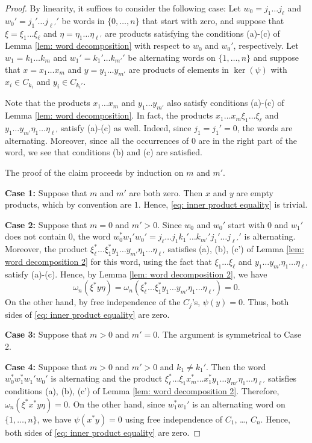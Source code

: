 \documentclass[10pt]{amsart}
\numberwithin{equation}{section}
\theoremstyle{definition}
\begin{document}
\begin{proof}
By linearity, it suffices to consider the following case:  Let $w_0 = j_1 \dots j_\ell$ and $w_0' = j_1' \dots j_{\ell'}'$ be words in $\{0,\dots,n\}$ that start with zero, and suppose that $\xi = \xi_1 \dots \xi_\ell$ and $\eta = \eta_1 \dots \eta_{\ell'}$ are products satisfying the conditions (a)-(c) of Lemma \ref{lem: word decomposition} with respect to $w_0$ and $w_0'$, respectively.  Let $w_1 = k_1 \dots k_m$ and $w_1' = k_1' \dots k_{m'}'$ be alternating words on $\{1,\dots,n\}$ and suppose that $x = x_1 \dots x_m$ and $y = y_1 \dots y_{m'}$ are products of elements in $\ker(\psi)$ with $x_i \in C_{k_i}$ and $y_i \in C_{k_i'}$.

Note that the products $x_1 \dots x_m$ and $y_1 \dots y_{m'}$ also satisfy conditions (a)-(c) of Lemma \ref{lem: word decomposition}.  In fact, the products $x_1 \dots x_m \xi_1 \dots \xi_\ell$ and $y_1 \dots y_{m'} \eta_1 \dots \eta_{\ell'}$ satisfy (a)-(c) as well.  Indeed, since $j_1 = j_1' = 0$, the words are alternating.  Moreover, since all the occurrences of $0$ are in the right part of the word, we see that conditions (b) and (c) are satisfied.

The proof of the claim proceeds by induction on $m$ and $m'$.

\textbf{Case 1:} Suppose that $m$ and $m'$ are both zero.  Then $x$ and $y$ are empty products, which by convention are $1$.  Hence, \eqref{eq: inner product equality} is trivial. 

\textbf{Case 2:} Suppose that $m = 0$ and $m' > 0$.  Since $w_0$ and $w_0'$ start with $0$ and $w_1'$ does not contain $0$, the word $w_0^* w_1' w_0' = j_{\ell} \dots j_1 k_1' \dots k_{m'}' j_1' \dots j_{\ell'}'$ is alternating.  Moreover, the product $\xi_\ell^* \dots \xi_1^* y_1 \dots y_{m'} \eta_1 \dots \eta_{\ell'}$ satisfies (a), (b), (c') of Lemma \ref{lem: word decomposition 2} for this word, using the fact that $\xi_1 \dots \xi_\ell$ and $y_1 \dots y_{m'} \eta_1 \dots \eta_{\ell'}$ satisfy (a)-(c).  Hence, by Lemma \ref{lem: word decomposition 2}, we have
\[
\omega_n(\xi^* y \eta) = \omega_n(\xi_\ell^* \dots \xi_1^* y_1 \dots y_{m'} \eta_1 \dots \eta_{\ell'}) = 0.
\]
On the other hand, by free independence of the $C_j$'s, $\psi(y) = 0$.  Thus, both sides of \eqref{eq: inner product equality} are zero.

\textbf{Case 3:} Suppose that $m > 0$ and $m' = 0$.  The argument is symmetrical to Case 2.

\textbf{Case 4:} Suppose that $m > 0$ and $m' > 0$ and $k_1 \neq k_1'$.  Then the word $w_0^* w_1^* w_1' w_0'$ is alternating and the product $\xi_\ell^* \dots \xi_1 x_m^* \dots x_1^* y_1 \dots y_{m'} \eta_1 \dots \eta_{\ell'}$ satisfies conditions (a), (b), (c') of Lemma \ref{lem: word decomposition 2}. Therefore, $\omega_n(\xi^*x^*y\eta) = 0$.  On the other hand, since $w_1^*w_1'$ is an alternating word on $\{1,\dots,n\}$, we have $\psi(x^*y) = 0$ using free independence of $C_1$, \dots, $C_n$.  Hence, both sides of \eqref{eq: inner product equality} are zero.


\end{proof}
\end{document}
